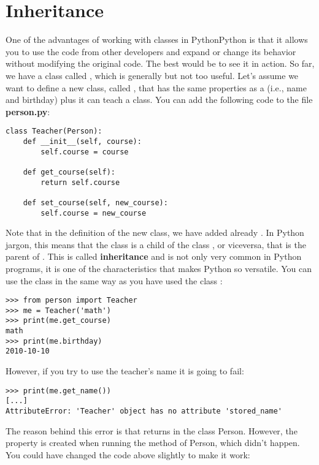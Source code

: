 \section{Inheritance}\label{sec:inheritance}
One of the advantages of working with classes in PythonPython is that it allows you to use the code from other developers and expand or change its behavior without modifying the original code. The best would be to see it in action. So far, we have a class called , which is generally but not too useful. Let's assume we want to define a new class, called , that has the same properties as a  (i.e., name and birthday) plus it can teach a class. You can add the following code to the file \textbf{person.py}:

\begin{verbatim}
class Teacher(Person):
    def __init__(self, course):
        self.course = course

    def get_course(self):
        return self.course

    def set_course(self, new_course):
        self.course = new_course
\end{verbatim}

Note that in the definition of the new  class, we have added already . In Python jargon, this means that the class  is a child of the class , or viceversa, that  is the parent of . This is called \textbf{inheritance} and is not only very common in Python programs, it is one of the characteristics that makes Python so versatile. You can use the class  in the same way as you have used the class :

\begin{verbatim}
>>> from person import Teacher
>>> me = Teacher('math')
>>> print(me.get_course)
math
>>> print(me.birthday)
2010-10-10
\end{verbatim}

However, if you try to use the teacher's name it is going to fail:

\begin{verbatim}
>>> print(me.get_name())
[...]
AttributeError: 'Teacher' object has no attribute 'stored_name'
\end{verbatim}

The reason behind this error is that  returns  in the class Person. However, the property  is created when running the  method of Person, which didn't happen. You could have changed the code above slightly to make it work:

